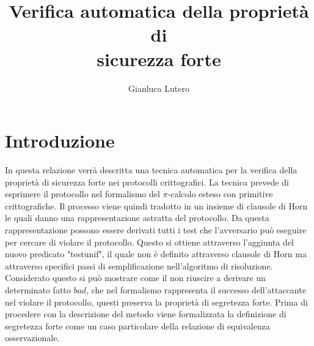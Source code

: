 \documentclass[12pt]{article}
\title{Verifica automatica della proprietà di\\ sicurezza forte}
\author{Gianluca Lutero}
\date{}
\begin{document}
\maketitle

\newpage
\section*{Introduzione}
In questa relazione verrà descritta una tecnica automatica per la verifica della proprietà di sicurezza forte nei protocolli crittografici. La tecnica prevede di esprimere il protocollo nel formalismo del $\pi$-calcolo esteso con primitive crittografiche. Il processo viene quindi tradotto in un insieme di clausole di Horn le quali danno una rappresentazione astratta del protocollo. Da questa rappresentazione possono essere derivati tutti i test che l'avversario può eseguire per cercare di violare il protocollo. Questo si ottiene attraverso l'aggiunta del nuovo predicato "testunif", il quale non è definito attraverso clausole di Horn ma attraverso specifici passi di semplificazione nell'algoritmo di risoluzione. Considerato questo si può mostrare come il non riuscire a derivare un determinato fatto $bad$, che nel formalismo rappresenta il successo dell'attaccante nel violare il protocollo, questi preserva la proprietà di segretezza forte. Prima di procedere con la descrizione del metodo viene formalizzata la definizione di segretezza forte come un caso particolare della relazione di equivalenza osservazionale.

\newpage
\end{document}
